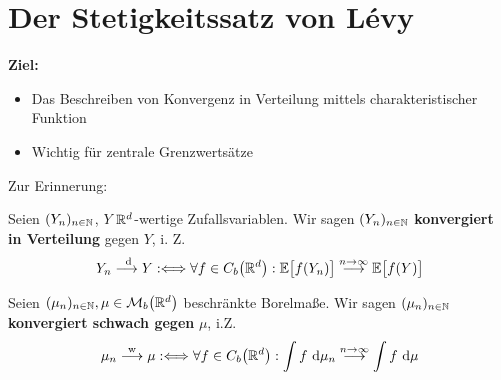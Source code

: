 
\chapter{Der Stetigkeitssatz von Lévy} %
\textbf{Ziel:}
\begin{itemize}
	\item Das Beschreiben von Konvergenz in Verteilung mittels charakteristischer Funktion
	\item Wichtig für zentrale Grenzwertsätze
\end{itemize}

Zur Erinnerung:

\begin{defi}\enter
	Seien $(Y_n)_{n\in\mathbb{N}}$, $Y$ $\mathbb{R}^d$-wertige Zufallsvariablen.
	Wir sagen $(Y_n)_{n\in\mathbb{N}}$ \textbf{konvergiert in Verteilung} gegen $Y$, i. Z.
	\begin{align*}
		Y_n\overset{\text{ d}}{\longrightarrow}Y
		:\Longleftrightarrow\forall f\in C_b\big(\mathbb{R}^d\big):
		\mathbb{E}\big[f(Y_n)\big]\overset{n\to\infty}{\longrightarrow}\mathbb{E}\big[f(Y)\big]
	\end{align*}
\end{defi}

\begin{defi}\enter
	Seien $(\mu_n)_{n\in\mathbb{N}},\mu\in\mathcal{M}_b\big(\mathbb{R}^d\big)$ beschränkte Borelmaße.
	Wir sagen $(\mu_n)_{n\in\mathbb{N}}$ \textbf{konvergiert schwach gegen} $\mu$, i.Z.
	\begin{align*}
		\mu_n\overset{\text{w}}{\longrightarrow}\mu 
		:\Longleftrightarrow\forall f\in C_b\big(\mathbb{R}^d\big):\int\limits f\text{ d}\mu_n\overset{n\to\infty}{\longrightarrow}\int\limits f\text{ d}\mu 
	\end{align*}
\end{defi}

